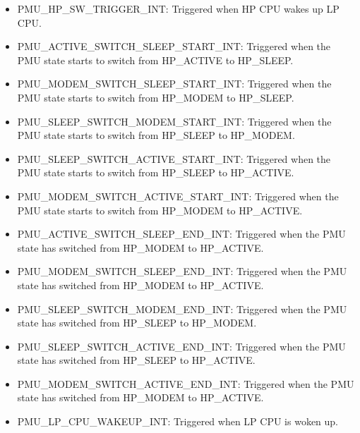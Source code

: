 \documentclass[main\_\_EN.tex]{subfiles}
\begin{document}
\begin{itemize}
\item \label{int:PMUHPSWTRIGGERINT}PMU\_HP\_SW\_TRIGGER\_INT: Triggered when HP CPU wakes up LP CPU.

\item \label{int:PMUACTIVESWITCHSLEEPSTARTINT}PMU\_ACTIVE\_SWITCH\_SLEEP\_START\_INT: Triggered when the PMU state starts to switch from HP\_ACTIVE to HP\_SLEEP.
\item \label{int:PMUMODEMSWITCHSLEEPSTARTINT}PMU\_MODEM\_SWITCH\_SLEEP\_START\_INT: Triggered when the PMU state starts to switch from HP\_MODEM to HP\_SLEEP.
\item \label{int:PMUSLEEPSWITCHMODEMSTARTINT}PMU\_SLEEP\_SWITCH\_MODEM\_START\_INT: Triggered when the PMU state starts to switch from HP\_SLEEP to HP\_MODEM.
\item \label{int:PMUSLEEPSWITCHACTIVESTARTINT}PMU\_SLEEP\_SWITCH\_ACTIVE\_START\_INT: Triggered when the PMU state starts to switch from HP\_SLEEP to HP\_ACTIVE.
\item \label{int:PMUMODEMSWITCHACTIVESTARTINT}PMU\_MODEM\_SWITCH\_ACTIVE\_START\_INT: Triggered when the PMU state starts to switch from HP\_MODEM to HP\_ACTIVE.
\item \label{int:PMUACTIVESWITCHSLEEPENDINT}PMU\_ACTIVE\_SWITCH\_SLEEP\_END\_INT: Triggered when the PMU state has switched from HP\_MODEM to HP\_ACTIVE.
\item \label{int:PMUMODEMSWITCHSLEEPENDINT}PMU\_MODEM\_SWITCH\_SLEEP\_END\_INT: Triggered when the PMU state has switched from  HP\_MODEM to HP\_ACTIVE.
\item \label{int:PMUSLEEPSWITCHMODEMENDINT}PMU\_SLEEP\_SWITCH\_MODEM\_END\_INT: Triggered when the PMU state has switched from  HP\_SLEEP to HP\_MODEM.
\item \label{int:PMUSLEEPSWITCHACTIVEENDINT}PMU\_SLEEP\_SWITCH\_ACTIVE\_END\_INT: Triggered when the PMU state has switched from HP\_SLEEP to HP\_ACTIVE.
\item \label{int:PMUMODEMSWITCHACTIVEENDINT}PMU\_MODEM\_SWITCH\_ACTIVE\_END\_INT: Triggered when the PMU state has switched from HP\_MODEM to HP\_ACTIVE.
\item \label{int:PMULPCPUWAKEUPINT}PMU\_LP\_CPU\_WAKEUP\_INT: Triggered when LP CPU is woken up.
\end{itemize}
\end{document}
